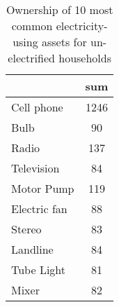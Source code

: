 \begin{table}[htbp]\centering
\def\sym#1{\ifmmode^{#1}\else\(^{#1}\)\fi}
\caption{Ownership of 10 most common electricity-using assets for un-electrified households \label{tab:"label"}}
\begin{tabular*}{0.9\hsize}{@{\hskip\tabcolsep\extracolsep\fill}l*{1}{c}}
\toprule
                                &      sum\\
\midrule
Cell phone                      &     1246\\
Bulb                            &       90\\
Radio                           &      137\\
Television                      &       84\\
Motor Pump                      &      119\\
Electric fan                    &       88\\
Stereo                          &       83\\
Landline                        &       84\\
Tube Light                      &       81\\
Mixer                           &       82\\
\bottomrule
\end{tabular*}
\end{table}

